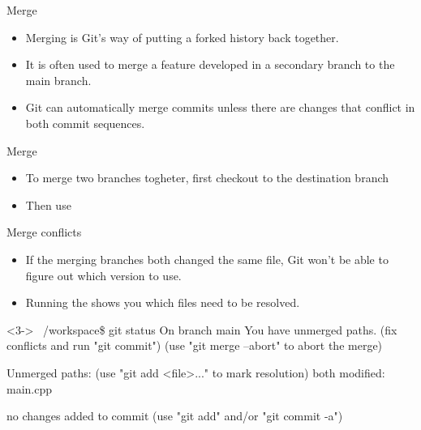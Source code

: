 \begin{frame}[fragile]{Merge}
\begin{itemize}[<+->]
    \item Merging is Git's way of putting a forked history back together.
    \item It is often used to merge a feature developed in a secondary branch to the main branch.
    \item Git can automatically merge commits unless there are changes that conflict in both commit sequences.
\end{itemize}
\end{frame}

\begin{frame}[fragile]{Merge \insertcontinuationtext}
    \begin{itemize}[<+->]
        \item To merge two branches togheter, first checkout to the destination branch
        \item Then use 
    \end{itemize}
\end{frame}

\begin{frame}[fragile]{Merge conflicts}
    \begin{itemize}[<+->]
        \item If the merging branches both changed the same file, Git won't be able to figure out which version to use.
        \item Running the  shows you which files need to be resolved.
    \end{itemize}
    \begin{shellblock}<3->
~/workspace\$ git status \inserthitenter
On branch main
You have unmerged paths.
  (fix conflicts and run "git commit")
  (use "git merge --abort" to abort the merge)

Unmerged paths:
  (use "git add <file>..." to mark resolution)
        both modified:   main.cpp

no changes added to commit (use "git add" and/or "git commit -a")    
    \end{shellblock}
\end{frame}

